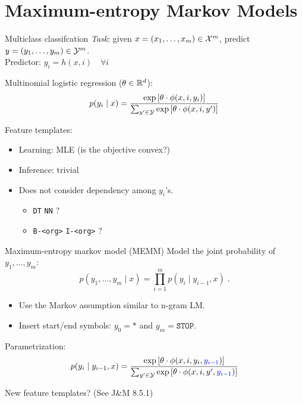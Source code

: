 \documentclass[usenames,dvipsnames,notes]{beamer}
\begin{document}
\section{Maximum-entropy Markov Models}

\begin{frame}
    {Multiclass classifcation}
    \emph{Task}: given $x=(x_1,\ldots,x_m) \in \mathcal{X}^m$, predict
    $y=(y_1,\ldots,y_m) \in \mathcal{Y}^m$.\\
    Predictor: $y_i=h(x, i) \quad \forall i$

    Multinomial logistic regression ($\theta\in\mathbb{R}^d$):
    $$
    p(y_i\mid x) = \frac{\exp\left[ \theta\cdot\phi(x,i,y_i) \right]}
    {\sum_{y'\in\mathcal{Y}} \exp\left[ \theta\cdot\phi(x,i,y') \right]}
    $$

    \begin{overprint}
    Feature templates:\\
    \vspace{8em}
        \begin{itemize}
            \itemsep1em
            \item Learning: MLE (is the objective convex?)
            \item Inference: trivial
            \item Does not consider dependency among $y_i$'s.
                \begin{itemize}
                    \item[] \texttt{DT} \texttt{NN} ?
                    \item[] \texttt{B-<org>} \texttt{I-<org>} ?
                \end{itemize}
        \end{itemize}
    \end{overprint}
\end{frame}

\begin{frame}
    {Maximum-entropy markov model (MEMM)}
    Model the joint probability of $y_1, \ldots, y_m$:
    $$
    p(y_1,\ldots,y_m\mid x) = \prod_{i=1}^m p(y_i\mid y_{i-1}, x) \;.
    $$
    \vspace{-1em}
    \begin{itemize}
        \item Use the Markov assumption similar to n-gram LM.
        \item Insert start/end symbols: $y_0=*$ and $y_m=\texttt{STOP}$.
    \end{itemize}

    Parametrization:
    $$
    p(y_i\mid y_{i-1}, x) = \frac{\exp\left[ \theta\cdot\phi(x,i,y_i,{\color{blue}y_{i-1}}) \right]}
    {\sum_{y'\in\mathcal{Y}} \exp\left[ \theta\cdot\phi(x,i,y',{\color{blue}y_{i-1}}) \right]}
    $$

    New feature templates? (See J\&M 8.5.1)
\end{frame}
\end{document}
